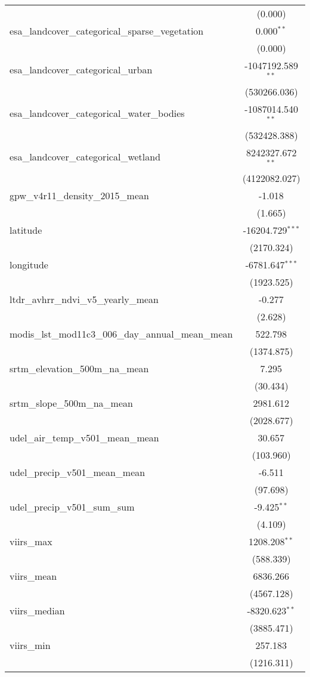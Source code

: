 \begin{table}[!htbp]
\begin{tabular}{@{\extracolsep{5pt}}lc}
  & (0.000) \\
 esa_landcover_categorical_sparse_vegetation & 0.000$^{**}$ \\
  & (0.000) \\
 esa_landcover_categorical_urban & -1047192.589$^{**}$ \\
  & (530266.036) \\
 esa_landcover_categorical_water_bodies & -1087014.540$^{**}$ \\
  & (532428.388) \\
 esa_landcover_categorical_wetland & 8242327.672$^{**}$ \\
  & (4122082.027) \\
 gpw_v4r11_density_2015_mean & -1.018$^{}$ \\
  & (1.665) \\
 latitude & -16204.729$^{***}$ \\
  & (2170.324) \\
 longitude & -6781.647$^{***}$ \\
  & (1923.525) \\
 ltdr_avhrr_ndvi_v5_yearly_mean & -0.277$^{}$ \\
  & (2.628) \\
 modis_lst_mod11c3_006_day_annual_mean_mean & 522.798$^{}$ \\
  & (1374.875) \\
 srtm_elevation_500m_na_mean & 7.295$^{}$ \\
  & (30.434) \\
 srtm_slope_500m_na_mean & 2981.612$^{}$ \\
  & (2028.677) \\
 udel_air_temp_v501_mean_mean & 30.657$^{}$ \\
  & (103.960) \\
 udel_precip_v501_mean_mean & -6.511$^{}$ \\
  & (97.698) \\
 udel_precip_v501_sum_sum & -9.425$^{**}$ \\
  & (4.109) \\
 viirs_max & 1208.208$^{**}$ \\
  & (588.339) \\
 viirs_mean & 6836.266$^{}$ \\
  & (4567.128) \\
 viirs_median & -8320.623$^{**}$ \\
  & (3885.471) \\
 viirs_min & 257.183$^{}$ \\
  & (1216.311) \\

\end{tabular}
\end{table}
